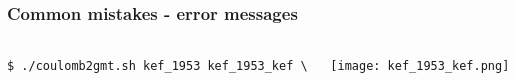 \begin{frame}[t,fragile]
  \frametitle{Common mistakes - error messages}
  \framesubtitle{}
  \label{fr4:hist_pics}
\begin{columns}[t]
  \begin{column}{.5\textwidth}
\begin{scriptsize}
\begin{verbatim}
$ ./coulomb2gmt.sh kef_1953 kef_1953_kef \

\end{verbatim}
\end{scriptsize}

  \end{column}
  \begin{column}{.5\textwidth}

\centering
  \texttt{[image: kef\_1953\_kef.png]}
  \end{column}
\end{columns}

\end{frame}
\note{}





















